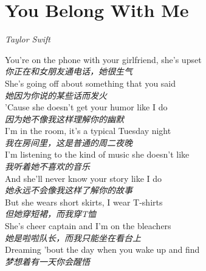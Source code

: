 \section{You Belong With Me}

\thispagestyle{empty}


\begin{center}
\textit{Taylor Swift}
\end{center}

\vspace{1em}

\begin{spacing}{1.5}
\begin{flushleft}
You're on the phone with your girlfriend, she's upset\\
\textit{你正在和女朋友通电话，她很生气}\\[0.5em]

She's going off about something that you said\\
\textit{她因为你说的某些话而发火}\\[0.5em]

'Cause she doesn't get your humor like I do\\
\textit{因为她不像我这样理解你的幽默}\\[0.5em]

I'm in the room, it's a typical Tuesday night\\
\textit{我在房间里，这是普通的周二夜晚}\\[0.5em]

I'm listening to the kind of music she doesn't like\\
\textit{我听着她不喜欢的音乐}\\[0.5em]

And she'll never know your story like I do\\
\textit{她永远不会像我这样了解你的故事}\\[0.5em]

But she wears short skirts, I wear T-shirts\\
\textit{但她穿短裙，而我穿T恤}\\[0.5em]

She's cheer captain and I'm on the bleachers\\
\textit{她是啦啦队长，而我只能坐在看台上}\\[0.5em]

Dreaming 'bout the day when you wake up and find\\
\textit{梦想着有一天你会醒悟}\\[0.5em]


\end{flushleft}
\end{spacing}
